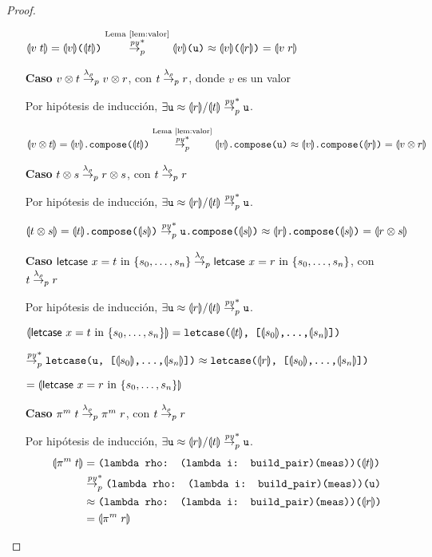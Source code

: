 \begin{proof}
\begin{itemize}
$\transl{v\;t} = \transl{v}\texttt{(}\transl{t}\texttt{)} \stackrel{\textrm{Lema~\ref{lem:valor}}}{\redpy^*_p} \transl{v}\texttt{(u)} \approx \transl{v}\texttt{(}\transl{r}\texttt{)} = \transl{v\;r}$

    \item[\textbf{Caso}] $v\otimes t \redlam_p v \otimes r$, con $t \redlam_p r$, donde $v$ es un valor

Por hipótesis de inducción, $\exists \texttt{u}\approx \transl{r} / \transl{t} \redpy_p^* \texttt{u}$.

$\transl{v\otimes t} = \transl{v}\texttt{.compose(\transl{t})} \stackrel{\textrm{Lema~\ref{lem:valor}}}{\redpy^*_p} \transl{v}\texttt{.compose(u)} \approx \transl{v}\texttt{.compose(\transl{r})} = \transl{v \otimes r}$

    \item[\textbf{Caso}] $t\otimes s \redlam_p r \otimes s$, con $t \redlam_p r$

Por hipótesis de inducción, $\exists \texttt{u}\approx \transl{r} / \transl{t} \redpy_p^* \texttt{u}$.

$\transl{t\otimes s} = \transl{t}\texttt{.compose(\transl{s})} \redpy_p^* \texttt{u.compose(\transl{s})} \approx \transl{r}\texttt{.compose(\transl{s})} = \transl{r \otimes s}$

    \item[\textbf{Caso}] $\textsf{letcase }x = t \textrm{ in } \{s_0,\dots,s_n\} \redlam_p \textsf{letcase }x = r \textrm{ in } \{s_0,\dots,s_n\}$, con $t \redlam_p r$

Por hipótesis de inducción, $\exists \texttt{u}\approx \transl{r} / \transl{t} \redpy_p^* \texttt{u}$.

$\transl{\textsf{letcase }x = t \textrm{ in } \{s_0,\dots,s_n\}} = \texttt{letcase(\transl{t}, [\transl{s_0},\dots,\transl{s_n}])}$


$\redpy_p^* \texttt{letcase(u, [\transl{s_0},\dots,\transl{s_n}])} \approx \texttt{letcase(\transl{r}, [\transl{s_0},\dots,\transl{s_n}])}$


$= \transl{\textsf{letcase }x = r \textrm{ in } \{s_0,\dots,s_n\}}$

    \item[\textbf{Caso}] $\pi^m\;t \redlam_p \pi^m\;r$, con $t \redlam_p r$

Por hipótesis de inducción, $\exists \texttt{u}\approx \transl{r} / \transl{t} \redpy_p^* \texttt{u}$.
\begin{align*}
 \transl{\pi^m\;t} &= \texttt{(lambda rho: (lambda i: build\_pair)(meas))(}\transl{t}\texttt{)}\\
 &\redpy_p^* \texttt{(lambda rho: (lambda i: build\_pair)(meas))(u)} \\
 &\approx \texttt{(lambda rho: (lambda i: build\_pair)(meas))(}\transl{r}\texttt{)} \\
 &= \transl{\pi^m\;r}
\end{align*}


\end{itemize}
\end{proof}
